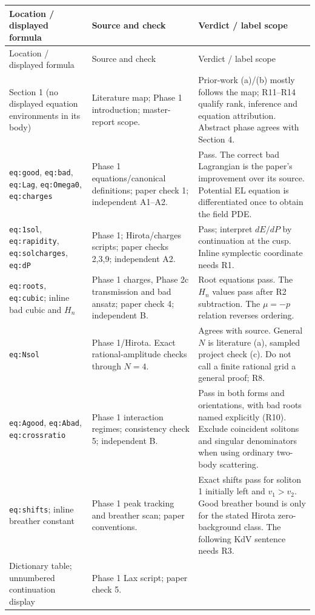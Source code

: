 \documentclass[11pt,a4paper]{article}
\newcommand{\file}[1]{\nolinkurl{#1}}
\begin{document}
\small
\begin{longtable}{@{}L{5.1cm}L{4.9cm}L{5.6cm}@{}}
\toprule Location / displayed formula & Source and check & Verdict / label scope\\\midrule
\endfirsthead
\toprule Location / displayed formula & Source and check & Verdict / label scope\\\midrule
\endhead
Section 1 (no displayed equation environments in its body) &
Literature map; Phase 1 introduction; master-report scope. &
Prior-work (a)/(b) mostly follows the map; R11--R14 qualify rank,
inference and equation attribution. Abstract phase agrees with Section 4.\\
\file{eq:good}, \file{eq:bad}, \file{eq:Lag}, \file{eq:Omega0}, \file{eq:charges} &
Phase 1 equations/canonical definitions; paper check 1; independent A1--A2. &
Pass. The correct bad Lagrangian is the paper's improvement over its source.
Potential EL equation is differentiated once to obtain the field PDE.\\
\file{eq:1sol}, \file{eq:rapidity}, \file{eq:solcharges}, \file{eq:dP} &
Phase 1; Hirota/charges scripts; paper checks 2,3,9; independent A2. &
Pass; interpret $dE/dP$ by continuation at the cusp. Inline symplectic
coordinate needs R1.\\
\file{eq:roots}, \file{eq:cubic}; inline bad cubic and $H_n$ &
Phase 1 charges, Phase 2c transmission and bad ansatz;
paper check 4; independent B. &
Root equations pass. The $H_n$ values pass after R2 subtraction.
The $\mu=-p$ relation reverses ordering.\\
\file{eq:Nsol} &
Phase 1/Hirota. Exact rational-amplitude checks through $N=4$. &
Agrees with source. General $N$ is literature (a), sampled project check (c).
Do not call a finite rational grid a general proof; R8.\\
\file{eq:Agood}, \file{eq:Abad}, \file{eq:crossratio} &
Phase 1 interaction regimes; consistency check 5; independent B. &
Pass in both forms and orientations, with bad roots named explicitly (R10).
Exclude coincident solitons and singular denominators when using ordinary
two-body scattering.\\
\file{eq:shifts}; inline breather constant &
Phase 1 peak tracking and breather scan; paper conventions. &
Exact shifts pass for soliton 1 initially left and $v_1>v_2$.
Good breather bound is only for the stated Hirota zero-background class.
The following KdV sentence needs R3.\\
Dictionary table; unnumbered continuation display &
Phase 1 Lax script; paper check 5. &

\end{longtable}
\end{document}
